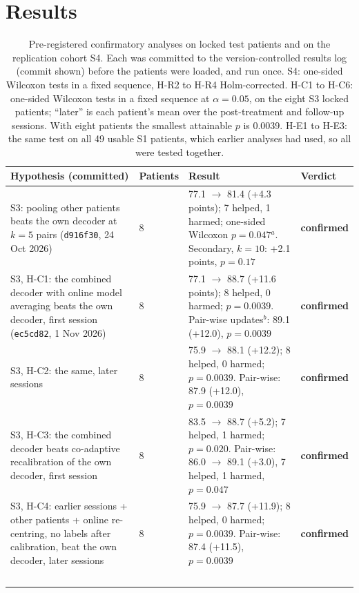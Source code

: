 \section{Results}

\begin{table}[t]
\centering
\caption{Pre-registered confirmatory analyses on locked test patients and on the replication cohort S4. Each was committed to the version-controlled results log (commit shown) before the patients were loaded, and run once. S4: one-sided Wilcoxon tests in a fixed sequence, H-R2 to H-R4 Holm-corrected. H-C1 to H-C6: one-sided Wilcoxon tests in a fixed sequence at $\alpha = 0.05$, on the eight S3 locked patients; ``later'' is each patient's mean over the post-treatment and follow-up sessions. With eight patients the smallest attainable $p$ is 0.0039. H-E1 to H-E3: the same test on all 49 usable S1 patients, which earlier analyses had used, so all were tested together.}
\label{tab:prereg}
\small
\begin{tabularx}{\linewidth}{@{}p{3.6cm} l X l@{}}
\toprule
Hypothesis (committed) & Patients & Result & Verdict \\
\midrule
S3: pooling other patients beats the own decoder at $k = 5$ pairs (\texttt{d916f30}, 24 Oct 2026) & 8 & 77.1\pct{} $\rightarrow$ 81.4\pct{} (+4.3 points); 7 helped, 1 harmed; one-sided Wilcoxon $p = 0.047$$^a$. Secondary, $k = 10$: +2.1 points, $p = 0.17$ & \textbf{confirmed} \\
\addlinespace
S3, H-C1: the combined decoder with online model averaging beats the own decoder, first session (\texttt{ec5cd82}, 1 Nov 2026) & 8 & 77.1\pct{} $\rightarrow$ 88.7\pct{} (+11.6 points); 8 helped, 0 harmed; $p = 0.0039$. Pair-wise updates$^b$: 89.1\pct{} (+12.0), $p = 0.0039$ & \textbf{confirmed} \\
\addlinespace
S3, H-C2: the same, later sessions & 8 & 75.9\pct{} $\rightarrow$ 88.1\pct{} (+12.2); 8 helped, 0 harmed; $p = 0.0039$. Pair-wise: 87.9\pct{} (+12.0), $p = 0.0039$ & \textbf{confirmed} \\
\addlinespace
S3, H-C3: the combined decoder beats co-adaptive recalibration of the own decoder, first session & 8 & 83.5\pct{} $\rightarrow$ 88.7\pct{} (+5.2); 7 helped, 1 harmed; $p = 0.020$. Pair-wise: 86.0\pct{} $\rightarrow$ 89.1\pct{} (+3.0), 7 helped, 1 harmed, $p = 0.047$ & \textbf{confirmed} \\
\addlinespace
S3, H-C4: earlier sessions + other patients + online re-centring, no labels after calibration, beat the own decoder, later sessions & 8 & 75.9\pct{} $\rightarrow$ 87.7\pct{} (+11.9); 8 helped, 0 harmed; $p = 0.0039$. Pair-wise: 87.4\pct{} (+11.5), $p = 0.0039$ & \textbf{confirmed} \\
$$
\end{tabularx}
\end{table}
